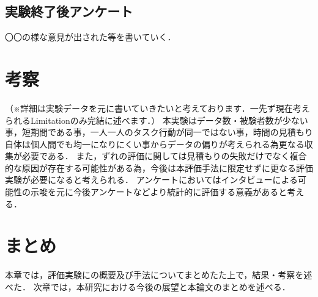 \subsection{実験終了後アンケート}
〇〇の様な意見が出された等を書いていく．
\section{考察}
（※詳細は実験データを元に書いていきたいと考えております．一先ず現在考えられるLimitationのみ完結に述べます．）
本実験はデータ数・被験者数が少ない事，短期間である事，一人一人のタスク行動が同一ではない事，時間の見積もり自体は個人間でも均一になりにくい事からデータの偏りが考えられる為更なる収集が必要である．
また，ずれの評価に関しては見積もりの失敗だけでなく複合的な原因が存在する可能性がある為，今後は本評価手法に限定せずに更なる評価実験が必要になると考えられる．
アンケートにおいてはインタビューによる可能性の示唆を元に今後アンケートなどより統計的に評価する意義があると考える．

\section{まとめ}
本章では，評価実験にの概要及び手法についてまとめたた上で，結果・考察を述べた．
次章では，本研究における今後の展望と本論文のまとめを述べる．
